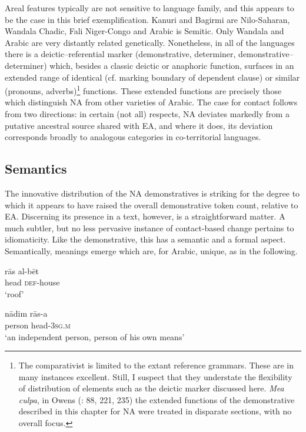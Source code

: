 \documentclass[output=paper]{langsci/langscibook}
\begin{document}
Areal features typically are not sensitive to language family, and this appears to be the case in this brief exemplification. Kanuri and Bagirmi are Nilo-Saharan, Wandala Chadic, Fali Niger-Congo and Arabic is Semitic. Only Wandala and Arabic are very distantly related genetically. Nonetheless, in all of the languages there is a deictic–referential marker (demonstrative, determiner, demonstrative–determiner) which, besides a classic deictic or anaphoric function, surfaces in an extended range of identical (cf. marking boundary of dependent clause) or similar (pronouns, adverbs)\footnote{The comparativist is limited to the extant reference grammars. These are in many instances excellent. Still, I suspect that they understate the flexibility of distribution of elements such as the deictic marker discussed here. \textit{Mea culpa}, in Owens (\citeyear{Owens1993}: 88, 221, 235) the extended functions of the demonstrative described in this chapter for NA were treated in disparate sections, with no overall focus.} functions. These extended functions are precisely those which distinguish NA from other varieties of Arabic. The case for contact follows from two directions: in certain (not all) respects, NA deviates markedly from a putative ancestral source shared with EA, and where it does, its deviation corresponds broadly to analogous categories in co-territorial languages.

\subsection{Semantics}

The innovative distribution of the NA demonstratives is striking for the degree to which it appears to have raised the overall demonstrative token count, relative to EA. Discerning its presence in a text, however, is a straightforward matter. A much subtler, but no less pervasive instance of contact-based change pertains to idiomaticity. Like the demonstrative, this has a semantic and a formal aspect. Semantically, meanings emerge which are, for Arabic, unique, as in the following.

\ea\label{bet}
\ea
\gll rās al-bēt\\
     head \textsc{def-}house\\
\glt ‘roof’\label{roof}

\ex 
\gll nādim rās-a\\
     person head-\textsc{3sg.m}\\
\glt ‘an independent person, person of his own means’\label{nadim}
\z
\z
\end{document}
